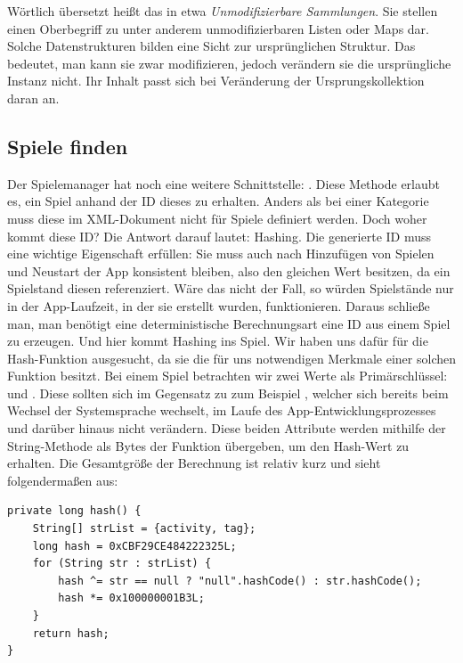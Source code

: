 \vspace{5mm}
\begin{infobox}[frametitle=Unmodifiable Collections]
Wörtlich übersetzt heißt das in etwa \emph{Unmodifizierbare Sammlungen}. Sie
stellen einen Oberbegriff zu unter anderem unmodifizierbaren Listen oder Maps
dar. Solche Datenstrukturen bilden eine Sicht zur ursprünglichen Struktur. Das
bedeutet, man kann sie zwar modifizieren, jedoch verändern sie die ursprüngliche
Instanz nicht. Ihr Inhalt passt sich bei Veränderung der Ursprungskollektion
daran an.
\end{infobox}

\subsection{Spiele finden}

Der Spielemanager hat noch eine weitere Schnittstelle:
. Diese Methode erlaubt es, ein Spiel anhand
der ID dieses zu erhalten. Anders als bei einer Kategorie muss diese im
XML-Dokument nicht für Spiele definiert werden. Doch woher kommt diese ID? Die
Antwort darauf lautet: Hashing. Die generierte ID muss eine wichtige Eigenschaft
erfüllen: Sie muss auch nach Hinzufügen von Spielen und Neustart der App
konsistent bleiben, also den gleichen Wert besitzen, da ein Spielstand diesen
referenziert. Wäre das nicht der Fall, so würden Spielstände nur in der
App-Laufzeit, in der sie erstellt wurden, funktionieren. Daraus schließe man,
man benötigt eine deterministische Berechnungsart eine ID aus einem Spiel zu
erzeugen. Und hier kommt Hashing ins Spiel. Wir haben uns dafür für die
 Hash-Funktion ausgesucht, da sie die für uns
notwendigen Merkmale einer solchen Funktion besitzt. Bei einem Spiel betrachten
wir zwei Werte als Primärschlüssel:  und . Diese
sollten sich im Gegensatz zu zum Beispiel , welcher sich bereits
beim Wechsel der Systemsprache wechselt, im Laufe des App-Entwicklungsprozesses
und darüber hinaus nicht verändern. Diese beiden Attribute werden mithilfe der
String-Methode  als Bytes der Funktion übergeben, um den
Hash-Wert zu erhalten. Die Gesamtgröße der Berechnung ist relativ kurz und sieht
folgendermaßen aus:

\begin{lstlisting} 
private long hash() {
	String[] strList = {activity, tag};
	long hash = 0xCBF29CE484222325L;
	for (String str : strList) {
		hash ^= str == null ? "null".hashCode() : str.hashCode();
		hash *= 0x100000001B3L;
	}
	return hash;
}
\end{lstlisting}


